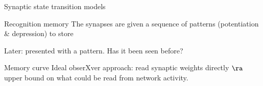 \documentclass[final,hyperref={pdfpagelabels=false,bookmarks=false}]{beamer}
\begin{document}
\begin{frame}{}
\begin{columns}[t]
\begin{column}{0.33\linewidth}
\begin{block}{Synaptic state transition models}
%
\end{block}



\begin{block}{Recognition memory}
%
 The synapses are given a sequence of patterns (potentiation \& depression) to store

 \vp
 \begin{center}
 \begin{inlineenumerate}
 \item {}
 \hspace{0.03\linewidth}
 \item {}
 \hspace{0.03\linewidth}
 \item {}
 \hspace{0.03\linewidth}
 \item {}
 \end{inlineenumerate}
 \end{center}

 \vp Later: presented with a pattern.
 Has it been seen before?
%
\end{block}


\begin{block}{Memory curve}
%
 Ideal obserXver approach: read synaptic weights directly
 $\ra$ upper bound on what could be read from network activity.


\end{block}
\end{column}
\end{columns}
\end{frame}
\end{document}
